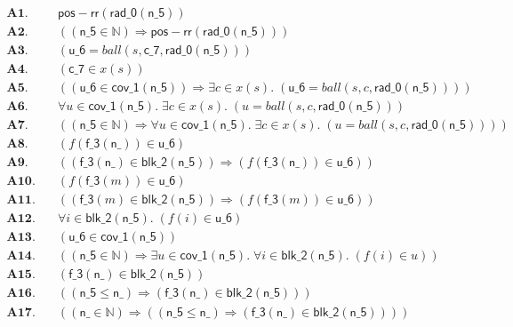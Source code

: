 \documentclass[11pt]{article}
\begin{document}
\begin{align*}
  \mathbf{A1.}\quad & \mathsf{pos{-}rr}(\mathsf{rad\_0}(\mathsf{n\_5})) \\
  \mathbf{A2.}\quad & ((\mathsf{n\_5} \in \mathbb{N}) \Rightarrow \mathsf{pos{-}rr}(\mathsf{rad\_0}(\mathsf{n\_5}))) \\
  \mathbf{A3.}\quad & (\mathsf{u\_6} = \mathit{ball}(s, \mathsf{c\_7}, \mathsf{rad\_0}(\mathsf{n\_5}))) \\
  \mathbf{A4.}\quad & (\mathsf{c\_7} \in x(s)) \\
  \mathbf{A5.}\quad & ((\mathsf{u\_6} \in \mathsf{cov\_1}(\mathsf{n\_5})) \Rightarrow \exists c \in x(s).\; (\mathsf{u\_6} = \mathit{ball}(s, c, \mathsf{rad\_0}(\mathsf{n\_5})))) \\
  \mathbf{A6.}\quad & \forall u \in \mathsf{cov\_1}(\mathsf{n\_5}).\; \exists c \in x(s).\; (u = \mathit{ball}(s, c, \mathsf{rad\_0}(\mathsf{n\_5}))) \\
  \mathbf{A7.}\quad & ((\mathsf{n\_5} \in \mathbb{N}) \Rightarrow \forall u \in \mathsf{cov\_1}(\mathsf{n\_5}).\; \exists c \in x(s).\; (u = \mathit{ball}(s, c, \mathsf{rad\_0}(\mathsf{n\_5})))) \\
  \mathbf{A8.}\quad & (f(\mathsf{f\_3}(\mathsf{n\_})) \in \mathsf{u\_6}) \\
  \mathbf{A9.}\quad & ((\mathsf{f\_3}(\mathsf{n\_}) \in \mathsf{blk\_2}(\mathsf{n\_5})) \Rightarrow (f(\mathsf{f\_3}(\mathsf{n\_})) \in \mathsf{u\_6})) \\
  \mathbf{A10.}\quad & (f(\mathsf{f\_3}(m)) \in \mathsf{u\_6}) \\
  \mathbf{A11.}\quad & ((\mathsf{f\_3}(m) \in \mathsf{blk\_2}(\mathsf{n\_5})) \Rightarrow (f(\mathsf{f\_3}(m)) \in \mathsf{u\_6})) \\
  \mathbf{A12.}\quad & \forall i \in \mathsf{blk\_2}(\mathsf{n\_5}).\; (f(i) \in \mathsf{u\_6}) \\
  \mathbf{A13.}\quad & (\mathsf{u\_6} \in \mathsf{cov\_1}(\mathsf{n\_5})) \\
  \mathbf{A14.}\quad & ((\mathsf{n\_5} \in \mathbb{N}) \Rightarrow \exists u \in \mathsf{cov\_1}(\mathsf{n\_5}).\; \forall i \in \mathsf{blk\_2}(\mathsf{n\_5}).\; (f(i) \in u)) \\
  \mathbf{A15.}\quad & (\mathsf{f\_3}(\mathsf{n\_}) \in \mathsf{blk\_2}(\mathsf{n\_5})) \\
  \mathbf{A16.}\quad & ((\mathsf{n\_5} \leq \mathsf{n\_}) \Rightarrow (\mathsf{f\_3}(\mathsf{n\_}) \in \mathsf{blk\_2}(\mathsf{n\_5}))) \\
  \mathbf{A17.}\quad & ((\mathsf{n\_} \in \mathbb{N}) \Rightarrow ((\mathsf{n\_5} \leq \mathsf{n\_}) \Rightarrow (\mathsf{f\_3}(\mathsf{n\_}) \in \mathsf{blk\_2}(\mathsf{n\_5})))) \\

\end{align*}
\end{document}
